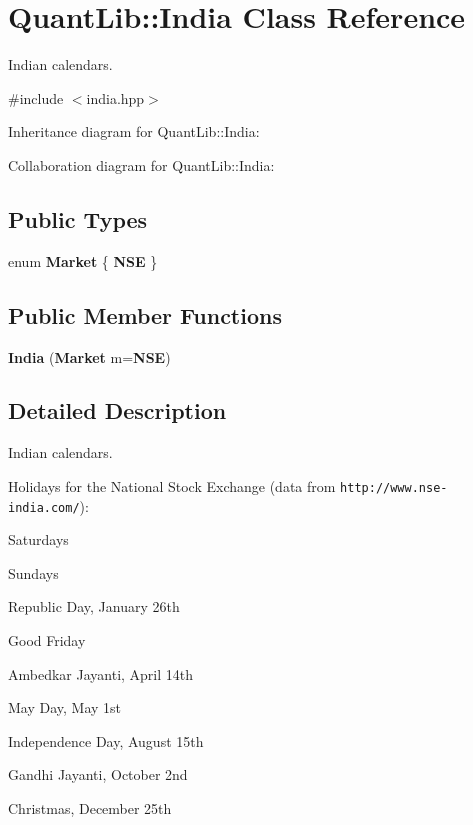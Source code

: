 \section{Quant\+Lib\+:\+:India Class Reference}
\label{class_quant_lib_1_1_india}


Indian calendars.  




{\ttfamily \#include $<$india.\+hpp$>$}



Inheritance diagram for Quant\+Lib\+:\+:India\+:


Collaboration diagram for Quant\+Lib\+:\+:India\+:
\subsection*{Public Types}
\begin{DoxyCompactItemize}
\item 
enum {\bf Market} \{ {\bf N\+SE}
 \}
\end{DoxyCompactItemize}
\subsection*{Public Member Functions}
\begin{DoxyCompactItemize}
\item 
{\bf India} ({\bf Market} m={\bf N\+SE})
\end{DoxyCompactItemize}


\subsection{Detailed Description}
Indian calendars. 

Holidays for the National Stock Exchange (data from {\tt http\+://www.\+nse-\/india.\+com/})\+: 
\begin{DoxyItemize}
\item Saturdays 
\item Sundays 
\item Republic Day, January 26th 
\item Good Friday 
\item Ambedkar Jayanti, April 14th 
\item May Day, May 1st 
\item Independence Day, August 15th 
\item Gandhi Jayanti, October 2nd 
\item Christmas, December 25th 
\end{DoxyItemize}


